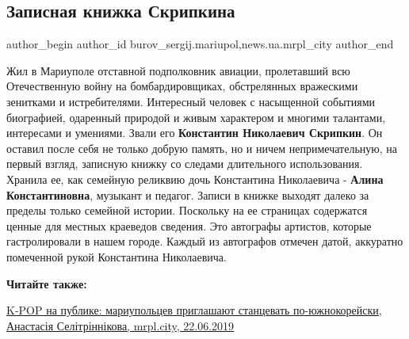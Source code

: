  
 
 
 
 
 
\subsection{Записная книжка Скрипкина}
\label{sec:22_06_2019.stz.news.ua.mrpl_city.1.zapisnaja_knizhka_skripkina}
 
\ifcmt
 author_begin
   author_id burov_sergij.mariupol,news.ua.mrpl_city
 author_end
\fi


Жил в Мариуполе отставной подполковник авиации, пролетавший всю Отечественную
войну на бомбардировщиках, обстрелянных вражескими зенитками и истребителями.
Интересный человек с насыщенной событиями биографией, одаренный природой и
живым характером и многими талантами, интересами и умениями. Звали его
\textbf{Константин Николаевич Скрипкин}. Он оставил после себя не только добрую память,
но и ничем непримечательную, на первый взгляд, записную книжку со следами
длительного использования. Хранила ее, как семейную реликвию дочь Константина
Николаевича - \textbf{Алина Константиновна}, музыкант и педагог. Записи в книжке выходят
далеко за пределы только семейной истории. Поскольку на ее страницах содержатся
ценные для местных краеведов сведения. Это автографы артистов, которые
гастролировали в нашем городе. Каждый из автографов отмечен датой, аккуратно
помеченной рукой Константина Николаевича.


\vspace{0.5cm}
\begin{minipage}{0.9\textwidth}
\textbf{Читайте также:}

\href{https://mrpl.city/news/view/k-pop-na-publike-mariupoltsev-priglashayut-stantsevat-po-yuzhnokorejski-video}{%
K-POP на публике: мариупольцев приглашают станцевать по-южнокорейски, Анастасія Селітріннікова, mrpl.city, 22.06.2019}
\end{minipage}
\vspace{0.5cm}

